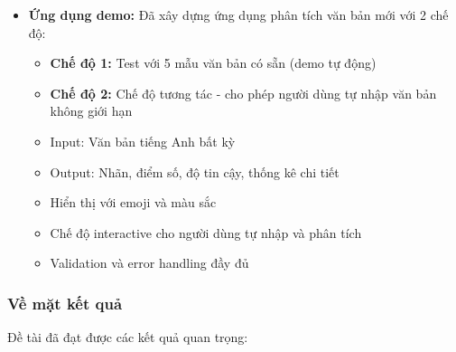 \begin{itemize}
    \item \textbf{Ứng dụng demo:} Đã xây dựng ứng dụng phân tích văn bản mới với 2 chế độ:
    \begin{itemize}
        \item \textbf{Chế độ 1:} Test với 5 mẫu văn bản có sẵn (demo tự động)
        \item \textbf{Chế độ 2:} Chế độ tương tác - cho phép người dùng tự nhập văn bản không giới hạn
        \item Input: Văn bản tiếng Anh bất kỳ
        \item Output: Nhãn, điểm số, độ tin cậy, thống kê chi tiết
        \item Hiển thị với emoji và màu sắc
        \item Chế độ interactive cho người dùng tự nhập và phân tích
        \item Validation và error handling đầy đủ
    \end{itemize}
\end{itemize}

\subsubsection{Về mặt kết quả}
Đề tài đã đạt được các kết quả quan trọng:

